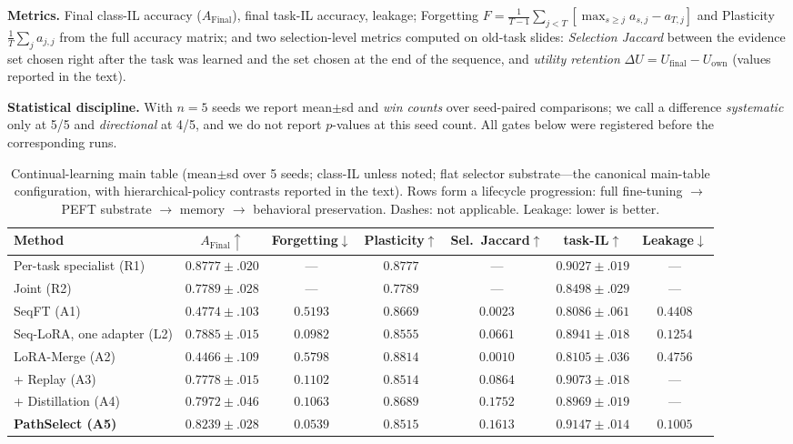 \documentclass{article}
\begin{document}
\textbf{Metrics.} Final class-IL accuracy ($A_{\mathrm{Final}}$), final task-IL accuracy, leakage; Forgetting $F = \frac{1}{T-1}\sum_{j<T}[\max_{s\ge j} a_{s,j} - a_{T,j}]$ and Plasticity $\frac{1}{T}\sum_j a_{j,j}$ from the full accuracy matrix; and two selection-level metrics computed on old-task slides: \emph{Selection Jaccard} between the evidence set chosen right after the task was learned and the set chosen at the end of the sequence, and \emph{utility retention} $\Delta U = U_{\mathrm{final}} - U_{\mathrm{own}}$ (values reported in the text).

\textbf{Statistical discipline.} With $n{=}5$ seeds we report mean$\pm$sd and \emph{win counts} over seed-paired comparisons; we call a difference \emph{systematic} only at 5/5 and \emph{directional} at 4/5, and we do not report $p$-values at this seed count. All gates below were registered before the corresponding runs.

\begin{table}[t]
\centering\footnotesize
\caption{Continual-learning main table (mean$\pm$sd over 5 seeds; class-IL unless noted; flat selector substrate---the canonical main-table configuration, with hierarchical-policy contrasts reported in the text). Rows form a lifecycle progression: full fine-tuning $\to$ PEFT substrate $\to$ memory $\to$ behavioral preservation. Dashes: not applicable. Leakage: lower is better.}
\label{tab:main}
\begin{tabular}{lcccccc}
\toprule
Method & $A_{\mathrm{Final}}\!\uparrow$ & Forgetting$\downarrow$ & Plasticity$\uparrow$ & Sel.\ Jaccard$\uparrow$ & task-IL$\uparrow$ & Leakage$\downarrow$ \\
\midrule
Per-task specialist (R1) & $0.8777{\pm}.020$ & --- & $0.8777$ & --- & $0.9027{\pm}.019$ & --- \\
Joint (R2) & $0.7789{\pm}.028$ & --- & $0.7789$ & --- & $0.8498{\pm}.029$ & --- \\
\midrule
SeqFT (A1) & $0.4774{\pm}.103$ & $0.5193$ & $0.8669$ & $0.0023$ & $0.8086{\pm}.061$ & $0.4408$ \\
Seq-LoRA, one adapter (L2) & $0.7885{\pm}.015$ & $0.0982$ & $0.8555$ & $0.0661$ & $0.8941{\pm}.018$ & $0.1254$ \\
LoRA-Merge (A2) & $0.4466{\pm}.109$ & $0.5798$ & $0.8814$ & $0.0010$ & $0.8105{\pm}.036$ & $0.4756$ \\
\;+ Replay (A3) & $0.7778{\pm}.015$ & $0.1102$ & $0.8514$ & $0.0864$ & $0.9073{\pm}.018$ & --- \\
\;+ Distillation (A4) & $0.7972{\pm}.046$ & $0.1063$ & $0.8689$ & $0.1752$ & $0.8969{\pm}.019$ & --- \\
\textbf{PathSelect (A5)} & $\mathbf{0.8239{\pm}.028}$ & $\mathbf{0.0539}$ & $0.8515$ & $0.1613$ & $\mathbf{0.9147{\pm}.014}$ & $\mathbf{0.1005}$ \\
\bottomrule
\end{tabular}
\end{table}
\end{document}
